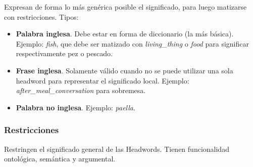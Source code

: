 \documentclass{article}
\begin{document}
\begin{multicols*}{3}
Expresan de forma lo más genérica posible el significado, para luego matizarse con restricciones. Tipos:
\begin{itemize}[itemsep=0pt, parsep=0pt, leftmargin=1em]
    \item \textbf{Palabra inglesa}. Debe estar en forma de diccionario (la más básica). Ejemplo: \emph{fish}, que debe ser matizado con \emph{living\_thing} o \emph{food} para significar respectivamente pez o pescado.
    \item \textbf{Frase inglesa}. Solamente válido cuando no se puede utilizar una sola headword para representar el significado local. Ejemplo: \emph{after\_meal\_conversation} para sobremesa. 
    \item \textbf{Palabra no inglesa}. Ejemplo: \emph{paella}.
\end{itemize}

\subsubsection*{Restricciones}

Restringen el significado general de las Headwords. Tienen funcionalidad ontológica, semántica y argumental.



\end{multicols*}
\end{document}
